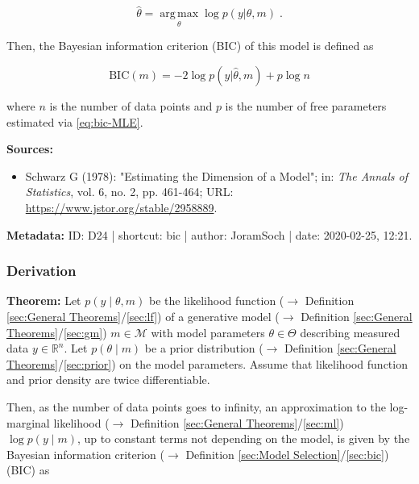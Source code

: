 \documentclass[a4paper,12pt]{book}
\begin{document}
\begin{equation} \label{eq:bic-MLE}
\hat{\theta} = \operatorname*{arg\,max}_\theta \log p(y | \theta, m) \; .
\end{equation}

Then, the Bayesian information criterion (BIC) of this model is defined as

\begin{equation} \label{eq:bic-BIC}
\mathrm{BIC}(m) = -2 \log p(y | \hat{\theta}, m) + p \log n
\end{equation}

where $n$ is the number of data points and $p$ is the number of free parameters estimated via \eqref{eq:bic-MLE}.

\vspace{1em}
\textbf{Sources:}
\begin{itemize}
\item Schwarz G (1978): "Estimating the Dimension of a Model"; in: \textit{The Annals of Statistics}, vol. 6, no. 2, pp. 461-464; URL: \url{https://www.jstor.org/stable/2958889}.
\end{itemize}


\vspace{1em}
\textbf{Metadata:} ID: D24 | shortcut: bic | author: JoramSoch | date: 2020-02-25, 12:21.


\subsubsection[\textbf{Derivation}]{Derivation} \label{sec:bic-der}

\vspace{1em}
\textbf{Theorem:} Let $p(y \mid \theta, m)$ be the likelihood function ($\rightarrow$ Definition \ref{sec:General Theorems}/\ref{sec:lf}) of a generative model ($\rightarrow$ Definition \ref{sec:General Theorems}/\ref{sec:gm}) $m \in \mathcal{M}$ with model parameters $\theta \in \Theta$ describing measured data $y \in \mathbb{R}^n$. Let $p(\theta \mid m)$ be a prior distribution ($\rightarrow$ Definition \ref{sec:General Theorems}/\ref{sec:prior}) on the model parameters. Assume that likelihood function and prior density are twice differentiable.

Then, as the number of data points goes to infinity, an approximation to the log-marginal likelihood ($\rightarrow$ Definition \ref{sec:General Theorems}/\ref{sec:ml}) $\log p(y \mid m)$, up to constant terms not depending on the model, is given by the Bayesian information criterion ($\rightarrow$ Definition \ref{sec:Model Selection}/\ref{sec:bic}) (BIC) as
\end{document}
